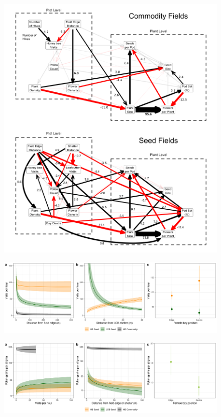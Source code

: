 \documentclass[12pt]{article} %
\begin{document}
\begin{figure}
    \centering
    \includegraphics[width=\textwidth,keepaspectratio=true]{allSEM.png}
\end{figure}

\begin{figure}
    \centering
    \includegraphics[width=\textwidth,keepaspectratio=true]{allVisits.png}
\end{figure}

\begin{figure}
    \centering
    \includegraphics[width=\textwidth,keepaspectratio=true]{allPollen.png}
\end{figure}
\end{document}
